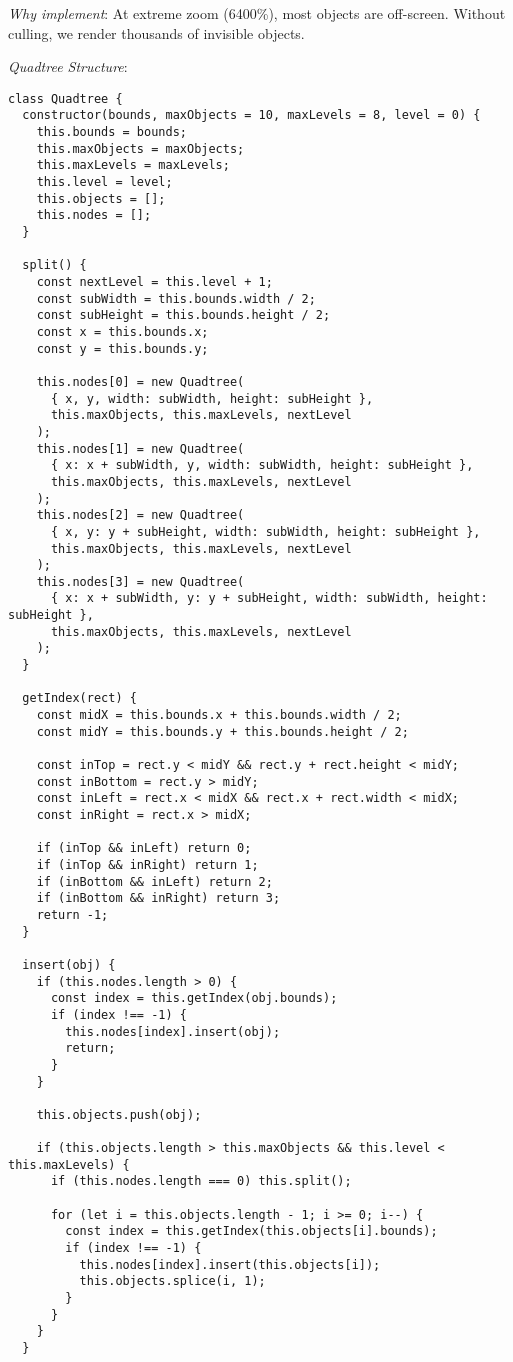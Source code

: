 \documentclass[11pt]{article}
\begin{document}
\begin{enumerate}
\begin{enumerate}
\emph{Why implement}: At extreme zoom (6400\%), most objects are off-screen. Without culling, we render thousands of invisible objects.

\emph{Quadtree Structure}:
\begin{verbatim}
class Quadtree {
  constructor(bounds, maxObjects = 10, maxLevels = 8, level = 0) {
    this.bounds = bounds;
    this.maxObjects = maxObjects;
    this.maxLevels = maxLevels;
    this.level = level;
    this.objects = [];
    this.nodes = [];
  }
  
  split() {
    const nextLevel = this.level + 1;
    const subWidth = this.bounds.width / 2;
    const subHeight = this.bounds.height / 2;
    const x = this.bounds.x;
    const y = this.bounds.y;
    
    this.nodes[0] = new Quadtree(
      { x, y, width: subWidth, height: subHeight },
      this.maxObjects, this.maxLevels, nextLevel
    );
    this.nodes[1] = new Quadtree(
      { x: x + subWidth, y, width: subWidth, height: subHeight },
      this.maxObjects, this.maxLevels, nextLevel
    );
    this.nodes[2] = new Quadtree(
      { x, y: y + subHeight, width: subWidth, height: subHeight },
      this.maxObjects, this.maxLevels, nextLevel
    );
    this.nodes[3] = new Quadtree(
      { x: x + subWidth, y: y + subHeight, width: subWidth, height: subHeight },
      this.maxObjects, this.maxLevels, nextLevel
    );
  }
  
  getIndex(rect) {
    const midX = this.bounds.x + this.bounds.width / 2;
    const midY = this.bounds.y + this.bounds.height / 2;
    
    const inTop = rect.y < midY && rect.y + rect.height < midY;
    const inBottom = rect.y > midY;
    const inLeft = rect.x < midX && rect.x + rect.width < midX;
    const inRight = rect.x > midX;
    
    if (inTop && inLeft) return 0;
    if (inTop && inRight) return 1;
    if (inBottom && inLeft) return 2;
    if (inBottom && inRight) return 3;
    return -1;
  }
  
  insert(obj) {
    if (this.nodes.length > 0) {
      const index = this.getIndex(obj.bounds);
      if (index !== -1) {
        this.nodes[index].insert(obj);
        return;
      }
    }
    
    this.objects.push(obj);
    
    if (this.objects.length > this.maxObjects && this.level < this.maxLevels) {
      if (this.nodes.length === 0) this.split();
      
      for (let i = this.objects.length - 1; i >= 0; i--) {
        const index = this.getIndex(this.objects[i].bounds);
        if (index !== -1) {
          this.nodes[index].insert(this.objects[i]);
          this.objects.splice(i, 1);
        }
      }
    }
  }
  

\end{verbatim}
\end{enumerate}
\end{enumerate}
\end{document}
